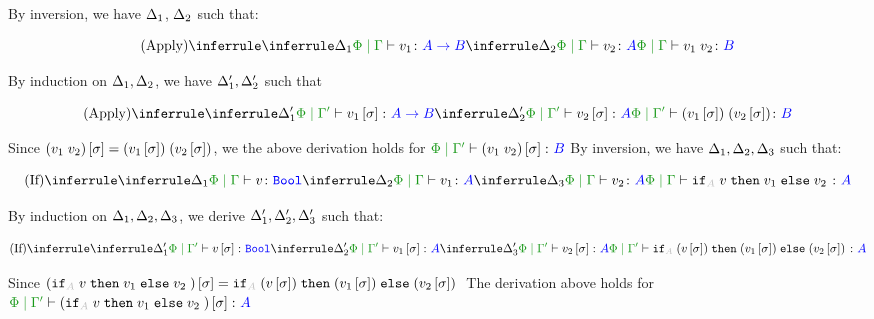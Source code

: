 {
    By inversion, we have $\Delta_1$, $\Delta_2$ such that:

    \begin{equation}
        \ntreeruleII{Apply}{
            \treeruleI{\D_1}{\etyperelation{\P}{\G}{v_1}{\ab}}
            }{
            \treeruleI{\D_2}{\etyperelation{\P}{\G}{v_2}{A}}
        }{\etyperelation{\P}{\G}{\apply{v_1}{v_2}}{B}}
    \end{equation}

    By induction on $\Delta_1, \Delta_2$, we have $\Delta_1',\Delta_2'$ such that

    \begin{equation}
        \ntreeruleII{Apply}{
            \treeruleI{\D'_1}{\etyperelation{\P}{\G'}{v_1\ssi}{\ab}}
            }{
            \treeruleI{\D_2'}{\etyperelation{\P}{\G'}{v_2\ssi}{A}}
        }{\etyperelation{\P}{\G'}{\apply{(v_1\ssi)}{(v_2\ssi)}}{B}}
    \end{equation}

    Since $(v_1\; v_2)\left[\sigma\right] = (v_1\left[\sigma\right])\;(v_2\left[\sigma\right])$, we the above derivation holds for $\etyperelation{\P}{\G'}{(\apply{v_1}{v_2})\ssi}{B}$
    By inversion, we have $\Delta_1,\Delta_2,\Delta_3$ such that:

    \begin{equation}
        \ntreeruleIII{If}{
            \treeruleI{\D_1}{\etyperelation{\P}{\G}{v}{\B}}
            }{
            \treeruleI{\D_2}{\etyperelation{\P}{\G}{v_1}{A}}
            }{
            \treeruleI{\D_3}{\etyperelation{\P}{\G}{v_2}{A}}
        }{
            \etyperelation{\P}{\G}{\pifthenelse{A}{v}{v_1}{v_2}}{A}
        }
    \end{equation}

    By induction on $\Delta_1,\Delta_2, \Delta_3$, we derive 
    $\Delta_1', \Delta_2',\Delta_3'$ such that:
    
    \begin{equation}
        \ntreeruleIII{If}{
            \treeruleI{\D_1'}{\etyperelation{\P}{\G'}{v\ssi}{\B}}
            }{
            \treeruleI{\D_2'}{\etyperelation{\P}{\G'}{v_1\ssi}{A}}
            }{
            \treeruleI{\D_3'}{\etyperelation{\P}{\G'}{v_2\ssi}{A}}
        }{
            \etyperelation{\P}{\G'}{\pifthenelse{A}{(v\ssi)}{(v_1\ssi)}{(v_2\ssi)}}{A}
        }
    \end{equation}

    Since $(\pifthenelse{A}{v}{v_1}{v_2})\ssi = \pifthenelse{A}{(v\ssi)}{(v_1\ssi)}{(v_2\ssi)}$ The derivation above holds for $\etyperelation{\P}{\G'}{(\pifthenelse{A}{v}{v_1}{v_2})\ssi}{A}$

}
